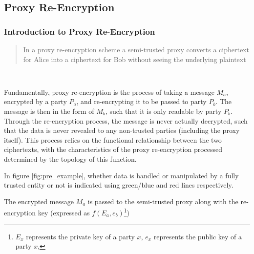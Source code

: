 \subsection{Proxy Re-Encryption}

\subsubsection{Introduction to Proxy Re-Encryption}

\blockquote{In a proxy re-encryption scheme a semi-trusted proxy converts a ciphertext for Alice into a ciphertext for Bob without seeing the underlying plaintext}~\autocite{greenateniese:2006:article}

Fundamentally, proxy re-encryption is the process of taking a message $M_a$, encrypted by a party $P_a$, and re-encrypting it to be passed to party $P_b$. The message is then in the form of $M_b$, such that it is only readable by party $P_b$. Through the re-encryption process, the message is never actually decrypted, such that the data is never revealed to any non-trusted parties (including the proxy itself). This process relies on the functional relationship between the two ciphertexts, with the characteristics of the proxy re-encryption processed determined by the topology of this function.



In figure \ref{fig:pre_example}, whether data is handled or manipulated by a fully trusted entity or not is indicated using green/blue and red lines respectively.

The encrypted message $M_a$ is passed to the semi-trusted proxy along with the re-encryption key (expressed as $f(E_a, e_b)$\footnote{$E_x$ represents the private key of a party $x$, $e_x$ represents the public key of a party $x$,})



